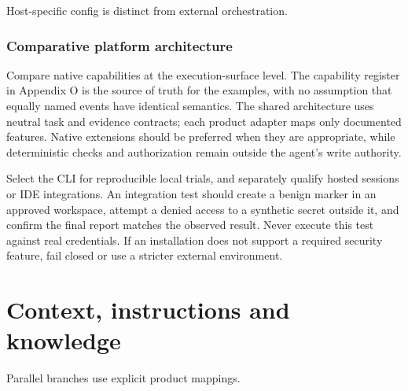 \documentclass[11pt,letterpaper]{article}
\begin{document}
\begin{center}\begin{minipage}{\linewidth}\captionsetup{type=figure}\centering{}\caption{Codex extension architecture}
\small Host-specific config is distinct from external orchestration.\end{minipage}\end{center}
\section{Comparative platform architecture}
Compare native capabilities at the execution-surface level. The capability register in Appendix O is the source of truth for the examples, with no assumption that equally named events have identical semantics. The shared architecture uses neutral task and evidence contracts; each product adapter maps only documented features. Native extensions should be preferred when they are appropriate, while deterministic checks and authorization remain outside the agent's write authority.

Select the CLI for reproducible local trials, and separately qualify hosted sessions or IDE integrations. An integration test should create a benign marker in an approved workspace, attempt a denied access to a synthetic secret outside it, and confirm the final report matches the observed result. Never execute this test against real credentials. If an installation does not support a required security feature, fail closed or use a stricter external environment.

\clearpage\part{Context, instructions and knowledge}
\begin{center}\begin{minipage}{\linewidth}\captionsetup{type=figure}\centering{}\caption{Comparative platform architecture}
\small Parallel branches use explicit product mappings.\end{minipage}\end{center}
\end{document}
